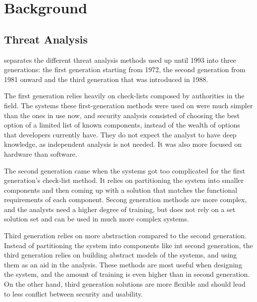\chapter{Background}
\label{chapter:background} 


\section{Threat Analysis}



\citet{threat_analysis_1993} separates the different threat analysis methods used up until 1993 into three generations: the first generation starting from 1972, the second generation from 1981 onward and the third generation that was introduced in 1988.

The first generation relies heavily on check-lists composed by authorities in the field. 
The systems these first-generation methods were used on were much simpler than the ones in use now, and security analysis consisted of choosing the best option of a limited list of known components, instead of the wealth of options that developers currently have.
They do not expect the analyst to have deep knowledge, as independent analysis is not needed.
It was also more focused on hardware than software. \cite{threat_analysis_1993}

The second generation came when the systems got too complicated for the first generation's check-list method. 
It relies on partitioning the system into smaller components and then coming up with a solution that matches the functional requirements of each component.
Secong generation methods are more complex, and the analysts need a higher degree of training, but does not rely on a set solution set and can be used in much more complex systems. \cite{threat_analysis_1993}

Third generation relies on more abstraction compared to the second generation. 
Instead of partitioning the system into components like int second generation, the third generation relies on building abstract models of the systems, and using them as an aid in the analysis.
These methods are most useful when designing the system, and the amount of training is even higher than in second generation.
On the other hand, third generation solutions are more flexible and should lead to less conflict between security and usability. \cite{threat_analysis_1993}

